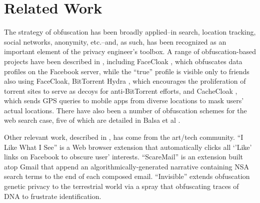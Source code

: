 \documentclass[conference]{IEEEtran}
\begin{document}
\section{Related Work}

The strategy of obfuscation has been broadly applied--in search\cite{Howe-2,Balsa}, location tracking\cite{Meyerowitz}, social networks\cite{Luo}, anonymity\cite{Chakravarty, Schulze}, etc.--and, as such, has been recognized as an important element of the privacy engineer's toolbox. A range of obfuscation-based projects have been described in \cite{Brunton}, including FaceCloak \cite{Luo}, which obfuscates data profiles on the Facebook server, while the ``true'' profile is visible only to friends also using FaceCloak,  BitTorrent Hydra \cite{Schulze}, which encourages the proliferation of torrent sites to serve as decoys for anti-BitTorrent efforts, and CacheCloak \cite{Meyerowitz}, which sends GPS queries to mobile apps from diverse locations to mask users' actual locations. There have also been a number of obfuscation schemes for the web search case, five of which are detailed in Balsa et al \cite{Balsa}.

Other relevant work, described in \cite{Howe-3}, has come from the art/tech community. ``I Like What I See'' is a Web browser extension that automatically clicks all `'Like' links on Facebook to obscure user' interests. ``ScareMail'' \cite{Grosser} is an extension built atop Gmail that append an algorithmically-generated narrative containing NSA search terms to the end of each composed email. ``Invisible'' extends obfuscation genetic privacy to the terrestrial world via a spray that obfuscating traces of DNA to frustrate identification.
\end{document}
